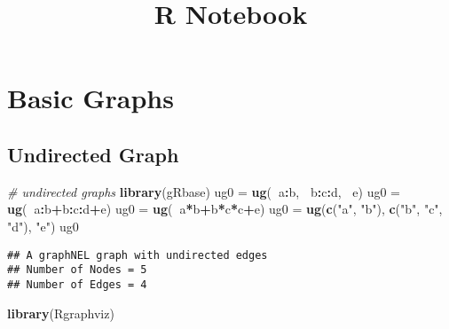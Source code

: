 \documentclass[]{article}
\title{R Notebook}
\author{}
\date{}
\newenvironment{Shaded}{\begin{snugshade}}{\end{snugshade}}
\newcommand{\KeywordTok}[1]{\textcolor[rgb]{0.13,0.29,0.53}{\textbf{#1}}}
\newcommand{\StringTok}[1]{\textcolor[rgb]{0.31,0.60,0.02}{#1}}
\newcommand{\CommentTok}[1]{\textcolor[rgb]{0.56,0.35,0.01}{\textit{#1}}}
\newcommand{\OperatorTok}[1]{\textcolor[rgb]{0.81,0.36,0.00}{\textbf{#1}}}
\newcommand{\NormalTok}[1]{#1}
\begin{document}
\maketitle

\section{Basic Graphs}\label{basic-graphs}

\subsection{Undirected Graph}\label{undirected-graph}

\begin{Shaded}
\begin{Highlighting}[]
\CommentTok{# undirected graphs }
\KeywordTok{library}\NormalTok{(gRbase)}
\NormalTok{ug0 =}\StringTok{ }\KeywordTok{ug}\NormalTok{(}\OperatorTok{~}\NormalTok{a}\OperatorTok{:}\NormalTok{b, }\OperatorTok{~}\NormalTok{b}\OperatorTok{:}\NormalTok{c}\OperatorTok{:}\NormalTok{d, }\OperatorTok{~}\NormalTok{e)}
\NormalTok{ug0 =}\StringTok{ }\KeywordTok{ug}\NormalTok{(}\OperatorTok{~}\NormalTok{a}\OperatorTok{:}\NormalTok{b}\OperatorTok{+}\NormalTok{b}\OperatorTok{:}\NormalTok{c}\OperatorTok{:}\NormalTok{d}\OperatorTok{+}\NormalTok{e)}
\NormalTok{ug0 =}\StringTok{ }\KeywordTok{ug}\NormalTok{(}\OperatorTok{~}\NormalTok{a}\OperatorTok{*}\NormalTok{b}\OperatorTok{+}\NormalTok{b}\OperatorTok{*}\NormalTok{c}\OperatorTok{*}\NormalTok{c}\OperatorTok{+}\NormalTok{e)}
\NormalTok{ug0 =}\StringTok{ }\KeywordTok{ug}\NormalTok{(}\KeywordTok{c}\NormalTok{(}\StringTok{"a"}\NormalTok{, }\StringTok{"b"}\NormalTok{), }\KeywordTok{c}\NormalTok{(}\StringTok{"b"}\NormalTok{, }\StringTok{"c"}\NormalTok{, }\StringTok{"d"}\NormalTok{), }\StringTok{"e"}\NormalTok{)}
\NormalTok{ug0}
\end{Highlighting}
\end{Shaded}

\begin{verbatim}
## A graphNEL graph with undirected edges
## Number of Nodes = 5 
## Number of Edges = 4
\end{verbatim}

\begin{Shaded}
\begin{Highlighting}[]
\KeywordTok{library}\NormalTok{(Rgraphviz)}
\end{Highlighting}
\end{Shaded}
\end{document}
